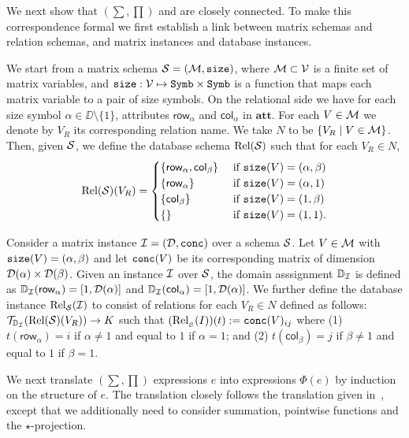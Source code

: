 \newcommand{\row}{\mathsf{row}}
\newcommand{\rows}{\mathsf{rows}}
\newcommand{\col}{\mathsf{col}}
\newcommand{\cols}{\mathsf{cols}}
\newcommand{\remark}[1]{\textcolor{darkgray}{\bf Remark: }\textcolor{gray}{#1} }
We next show that \lang$(\sum,\prod)$ and \ARA are closely connected. To make this correspondence formal we first establish a link between matrix schemas and relation schemas, and matrix instances and database instances. 

We start from a matrix schema $\mathcal{S}=(\mathcal{M},\texttt{size})$, where $\mathcal{M}\subset \mathcal{V}$ is a finite set of matrix variables, and $\texttt{size}: \mathcal{V} \mapsto \texttt{Symb}\times \texttt{Symb}$ is a function that maps each matrix variable to a pair of size symbols. On the relational side
we have for each size symbol $\alpha\in\DD\setminus\{1\}$, attributes $\row_\alpha$ and $\col_\alpha$ in $\mathbf{att}$. For each $V\in\mathcal{M}$ we denote
by $V_R$ its corresponding relation name. We take $N$ to be $\{V_R\mid V\in\mathcal{M}\}$. Then, given $\mathcal{S}$, we define the database  schema $\text{Rel}(\mathcal{S})$ such that for each $V_R\in N$,
\[
	\text{Rel}(\Sch)(V_R) = \begin{cases}
		\lbrace\row_\alpha,\col_\beta \rbrace & \text{ if $ \size(V)=(\alpha,\beta)$} \\
		\lbrace\row_\alpha \rbrace & \text{ if $ \size(V)=(\alpha,1)$} \\
		\lbrace\col_\beta \rbrace  &
	 \text{ if $ \size(V)=(1,\beta)$} \\
		\lbrace\rbrace & \text{ if $\size(V)=(1,1)$}.
\end{cases}
\]

Consider a matrix instance $\mathcal{I} = (\mathcal{D},\texttt{conc})$ over a schema $\mathcal{S}$.
Let $V\in\mathcal{M}$ with $\texttt{size}(V)=(\alpha,\beta)$ and let $\texttt{conc}(V)$ be its corresponding matrix of dimension $\mathcal{D}(\alpha)\times \mathcal{D}(\beta)$.
Given an instance $\mathcal{I}$ over $\mathcal{S}$, the domain asssignment $\mathbb{D}_{\mathcal{I}}$ is defined as 
$\mathbb{D}_{\I}(\row_\alpha)=[1,\dom(\alpha)]$ and 
$\mathbb{D}_{\I}(\col_\alpha)=[1,\dom(\alpha)]$. 
We further  define the database instance $\text{Rel}_{\mathcal{S}}(\mathcal{I})$  to consist of relations for each $V_R\in N$ defined as follows:
$\mathcal{T}_{\mathbb{D}_{\mathcal{I}}}(\text{Rel}(\mathcal{S})(V_R)) \to K$ such that
$(\text{Rel}_{_{\mathcal{S}}}(I))(t):=\texttt{conc}(V)_{ij}$ where (1) $t(\row_\alpha)=i$ if $\alpha\neq 1$ and equal to $1$ if $\alpha = 1$; and (2) $t(\col_\beta)=j$ if $\beta\neq 1$ and equal to $1$ if $\beta= 1$.

We next translate \lang$(\sum,\prod)$ expressions $e$ into \ARA expressions $\Phi(e)$ by induction on the structure of $e$. The translation closely follows the translation given in~\cite{brijder2019matrices}, except that we  additionally need to consider summation, pointwise functions and the $\star$-projection.

